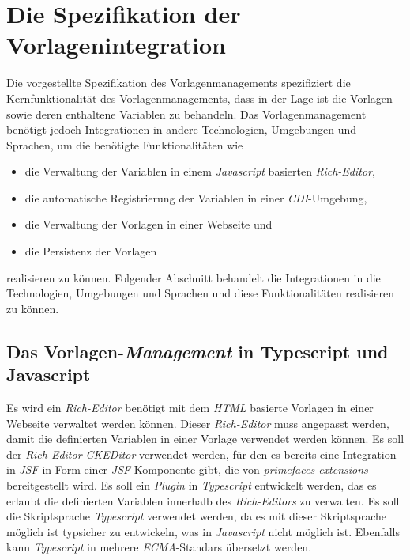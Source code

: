 \section{Die Spezifikation der Vorlagenintegration}
Die vorgestellte Spezifikation des Vorlagenmanagements spezifiziert die Kernfunktionalität des Vorlagenmanagements, dass in der Lage ist die Vorlagen sowie deren enthaltene Variablen zu behandeln. Das Vorlagenmanagement benötigt jedoch Integrationen in andere Technologien, Umgebungen und Sprachen, um die benötigte Funktionalitäten wie
\begin{itemize}
	\item die Verwaltung der Variablen in einem \emph{Javascript} basierten \emph{Rich-Editor},
	\item die automatische Registrierung der Variablen in einer \emph{CDI}-Umgebung,
	\item die Verwaltung der Vorlagen in einer Webseite und
	\item die Persistenz der Vorlagen
\end{itemize}
realisieren zu können. Folgender Abschnitt behandelt die Integrationen in die Technologien, Umgebungen und Sprachen und diese Funktionalitäten realisieren zu können.
 
\subsection{Das Vorlagen-\emph{Management} in Typescript und Javascript}
\label{sec:sub-typescript-javascript}
Es wird ein \emph{Rich-Editor} benötigt mit dem \emph{HTML} basierte Vorlagen in einer Webseite verwaltet werden können. Dieser \emph{Rich-Editor} muss angepasst werden, damit die definierten Variablen in einer Vorlage verwendet werden können. Es soll der \emph{Rich-Editor CKEDitor} verwendet werden, für den es bereits eine Integration in \emph{JSF} in Form einer \emph{JSF}-Komponente gibt, die von \emph{primefaces-extensions} bereitgestellt wird. Es soll ein \emph{Plugin} in \emph{Typescript} entwickelt werden, das es erlaubt die definierten Variablen innerhalb des \emph{Rich-Editors} zu verwalten. Es soll die Skriptsprache \emph{Typescript} verwendet werden, da es mit dieser Skriptsprache möglich ist typsicher zu entwickeln, was in \emph{Javascript} nicht möglich ist. Ebenfalls kann \emph{Typescript} in mehrere \emph{ECMA}-Standars übersetzt werden.

